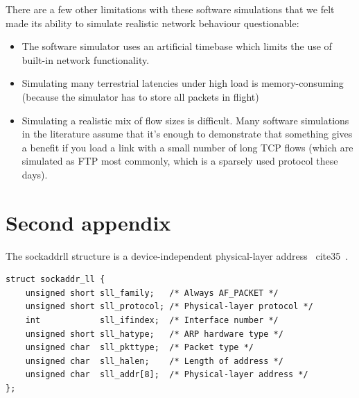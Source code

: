 \begin{appendices}
There are a few other limitations with these software simulations that we felt made its ability to simulate realistic network behaviour questionable:\\

\begin{itemize}
\item The software simulator uses an artificial timebase which limits the use of built-in network functionality.
\item Simulating many terrestrial latencies under high load is memory-consuming (because the simulator has to store all packets in flight)
\item Simulating a realistic mix of flow sizes is difficult. Many software simulations in the literature assume that it's enough to demonstrate that something gives a benefit if you load a link with a small number of long TCP flows (which are simulated as FTP most commonly, which is a sparsely used protocol these days).\\
\end{itemize}

\chapter{Second appendix}

The sockaddr\textunderscore ll structure is a device-independent physical-layer address ~cite{35}~\cite{44}.

\begin{lstlisting}
struct sockaddr_ll {
    unsigned short sll_family;   /* Always AF_PACKET */
    unsigned short sll_protocol; /* Physical-layer protocol */
    int            sll_ifindex;  /* Interface number */
    unsigned short sll_hatype;   /* ARP hardware type */
    unsigned char  sll_pkttype;  /* Packet type */
    unsigned char  sll_halen;    /* Length of address */
    unsigned char  sll_addr[8];  /* Physical-layer address */
};
\end{lstlisting}
\end{appendices}
